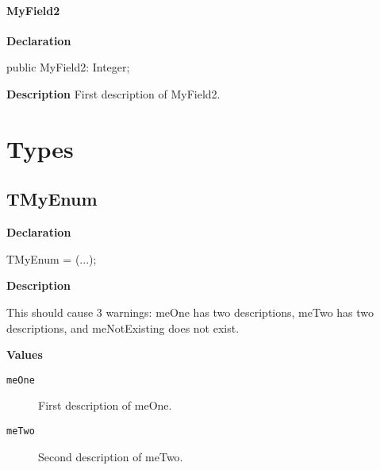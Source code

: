 \documentclass{report}
\begin{document}
\paragraph*{MyField2}\hspace*{\fill}

\begin{list}{}{
\setlength{\itemindent}{0cm}
\setlength{\listparindent}{0cm}
\setlength{\leftmargin}{\evensidemargin}
\addtolength{\leftmargin}{\tmplength}
\settowidth{\labelsep}{X}
\addtolength{\leftmargin}{\labelsep}
\setlength{\labelwidth}{\tmplength}
}
\begin{flushleft}
\item[\textbf{Declaration}\hfill]
\begin{ttfamily}
public MyField2: Integer;\end{ttfamily}


\end{flushleft}
\par
\item[\textbf{Description}]
First description of MyField2.

\end{list}
\section{Types}
\subsection*{TMyEnum}
\begin{list}{}{
\setlength{\itemindent}{0cm}
\setlength{\listparindent}{0cm}
\setlength{\leftmargin}{\evensidemargin}
\addtolength{\leftmargin}{\tmplength}
\settowidth{\labelsep}{X}
\addtolength{\leftmargin}{\labelsep}
\setlength{\labelwidth}{\tmplength}
}
\begin{flushleft}
\item[\textbf{Declaration}\hfill]
\begin{ttfamily}
TMyEnum = (...);\end{ttfamily}


\end{flushleft}
\par
\item[\textbf{Description}]
 





This should cause 3 warnings: meOne has two descriptions, meTwo has two descriptions, and meNotExisting does not exist.\item[\textbf{Values}]
\begin{description}
\item[\texttt{meOne}] First description of meOne.
\item[\texttt{meTwo}] Second description of meTwo.
\end{description}


\end{list}
\end{document}
